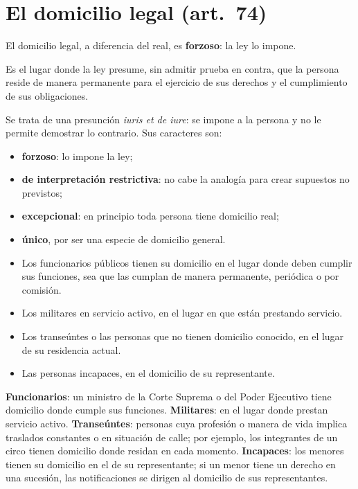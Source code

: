 \documentclass[12pt,oneside]{book}
\begin{document}
\section{El domicilio legal (art.~74)}

El domicilio legal, a diferencia del real, es \textbf{forzoso}: la ley lo impone.

\begin{definicion}
Es el lugar donde la ley presume, sin admitir prueba en contra, que la persona reside de manera permanente para el ejercicio de sus derechos y el cumplimiento de sus obligaciones.
\end{definicion}

Se trata de una presunción \textit{iuris et de iure}: se impone a la persona y no le permite demostrar lo contrario. Sus caracteres son:

\begin{itemize}
\item \textbf{forzoso}: lo impone la ley;
\item \textbf{de interpretación restrictiva}: no cabe la analogía para crear supuestos no previstos;
\item \textbf{excepcional}: en principio toda persona tiene domicilio real;
\item \textbf{único}, por ser una especie de domicilio general.
\end{itemize}

\begin{regla}
\begin{itemize}
\item Los funcionarios públicos tienen su domicilio en el lugar donde deben cumplir sus funciones, sea que las cumplan de manera permanente, periódica o por comisión.
\item Los militares en servicio activo, en el lugar en que están prestando servicio.
\item Los transeúntes o las personas que no tienen domicilio conocido, en el lugar de su residencia actual.
\item Las personas incapaces, en el domicilio de su representante.
\end{itemize}
\end{regla}

\begin{ejemplo}
\textbf{Funcionarios}: un ministro de la Corte Suprema o del Poder Ejecutivo tiene domicilio donde cumple sus funciones. \textbf{Militares}: en el lugar donde prestan servicio activo. \textbf{Transeúntes}: personas cuya profesión o manera de vida implica traslados constantes o en situación de calle; por ejemplo, los integrantes de un circo tienen domicilio donde residan en cada momento. \textbf{Incapaces}: los menores tienen su domicilio en el de su representante; si un menor tiene un derecho en una sucesión, las notificaciones se dirigen al domicilio de sus representantes.
\end{ejemplo}
\end{document}
